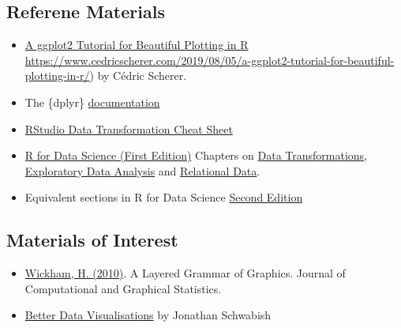 \documentclass[
  12pt,
]{book}
\begin{document}
\hypertarget{referene-materials}{%
\subsection*{Referene Materials}\label{referene-materials}}

\begin{itemize}
\item
  \href{}{A ggplot2 Tutorial for Beautiful Plotting in R} \url{https://www.cedricscherer.com/2019/08/05/a-ggplot2-tutorial-for-beautiful-plotting-in-r/}) by Cédric Scherer.
\item
  The \{dplyr\} \href{https://dplyr.tidyverse.org/}{documentation}
\item
  \href{https://github.com/rstudio/cheatsheets/blob/main/data-transformation.pdf}{RStudio Data Transformation Cheat Sheet}
\item
  \href{https://r4ds.had.co.nz/index.html}{R for Data Science (First Edition)} Chapters on \href{https://r4ds.had.co.nz/transform.html}{Data Transformations}, \href{https://r4ds.had.co.nz/exploratory-data-analysis.html}{Exploratory Data Analysis} and \href{https://r4ds.had.co.nz/relational-data.html}{Relational Data}.
\item
  Equivalent sections in R for Data Science \href{https://r4ds.hadley.nz/}{Second Edition}
\end{itemize}

\hypertarget{materials-of-interest-2}{%
\subsection*{Materials of Interest}\label{materials-of-interest-2}}

\begin{itemize}
\item
  \href{https://library-search.imperial.ac.uk/discovery/fulldisplay?docid=cdi_informaworld_taylorfrancis_310_1198_jcgs_2009_07098\&context=PC\&vid=44IMP_INST:ICL_VU1\&lang=en\&search_scope=MyInst_and_CI\&adaptor=Primo\%20Central\&tab=Everything\&query=any,contains,layered\%20grammar\%20of\%20graphics\&offset=0}{Wickham, H. (2010)}. A Layered Grammar of Graphics. Journal of Computational and Graphical Statistics.
\item
  \href{https://library-search.imperial.ac.uk/discovery/fulldisplay?docid=alma991000664639501591\&context=L\&vid=44IMP_INST:ICL_VU1\&lang=en\&search_scope=MyInst_and_CI\&adaptor=Local\%20Search\%20Engine\&tab=Everything\&query=any,contains,better\%20data\%20visualisations\&offset=0}{Better Data Visualisations} by Jonathan Schwabish
\end{itemize}
\end{document}
